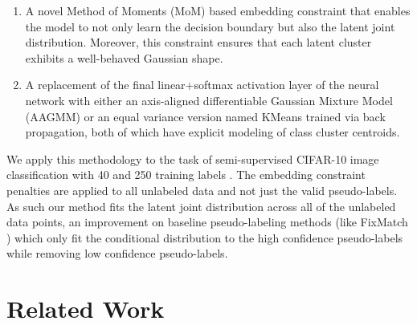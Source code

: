 \documentclass[10pt,twocolumn,letterpaper]{article}
\begin{document}
\begin{enumerate}
	\item A novel Method of Moments (MoM) based embedding constraint that enables the model to not only learn the decision boundary but also the latent joint distribution. 
	Moreover, this constraint ensures that each latent cluster exhibits a well-behaved Gaussian shape.
	\item A replacement of the final linear+softmax activation layer of the neural network with either an axis-aligned differentiable Gaussian Mixture Model (AAGMM) or an equal variance version named KMeans trained via back propagation, both of which have explicit modeling of class cluster centroids. 
\end{enumerate}

We apply this methodology to the task of semi-supervised CIFAR-10 image classification with 40 and 250 training labels \cite{cifar10}. 
The embedding constraint penalties are applied to all unlabeled data and not just the valid pseudo-labels.  
As such our method fits the latent joint distribution across all of the unlabeled data points, an improvement on baseline pseudo-labeling methods (like FixMatch \cite{sohn2020fixmatch}) which only fit the conditional distribution to the high confidence pseudo-labels while removing low confidence pseudo-labels.


\section{Related Work}
\end{document}
